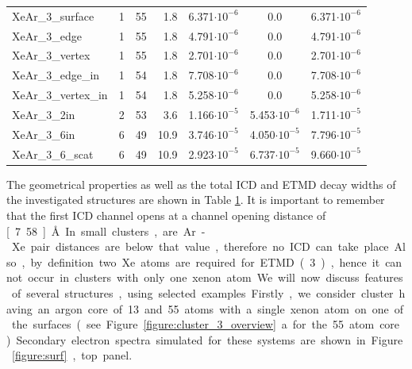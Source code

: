 \begin{table}[h]
\begin{tabular}{lrrrccc}
XeAr\_3\_surface     &      1   &     55   &  1.8  & 6.371$\cdot 10^{-6}$ & 0.0                  & 6.371$\cdot 10^{-6}$ \\
XeAr\_3\_edge        &      1   &     55   &  1.8  & 4.791$\cdot 10^{-6}$ & 0.0                  & 4.791$\cdot 10^{-6}$ \\
XeAr\_3\_vertex      &      1   &     55   &  1.8  & 2.701$\cdot 10^{-6}$ & 0.0                  & 2.701$\cdot 10^{-6}$ \\
XeAr\_3\_edge\_in    &      1   &     54   &  1.8  & 7.708$\cdot 10^{-6}$ & 0.0                  & 7.708$\cdot 10^{-6}$ \\
XeAr\_3\_vertex\_in  &      1   &     54   &  1.8  & 5.258$\cdot 10^{-6}$ & 0.0                  & 5.258$\cdot 10^{-6}$ \\
XeAr\_3\_2in         &      2   &     53   &  3.6  & 1.166$\cdot 10^{-5}$ & 5.453$\cdot 10^{-6}$ & 1.711$\cdot 10^{-5}$ \\
XeAr\_3\_6in         &      6   &     49   & 10.9  & 3.746$\cdot 10^{-5}$ & 4.050$\cdot 10^{-5}$ & 7.796$\cdot 10^{-5}$ \\
XeAr\_3\_6\_scat     &      6   &     49   & 10.9  & 2.923$\cdot 10^{-5}$ & 6.737$\cdot 10^{-5}$ & 9.660$\cdot 10^{-5}$ \\
\bottomrule
\end{tabular}
\label{table:theo_gammas}
\end{table}
%
The geometrical properties as well as the total ICD and ETMD decay widths
of the investigated structures are shown in Table \ref{table:theo_gammas}.
It is important to remember that the first ICD channel opens at a
channel opening distance of \unit[7.58]{\AA}. In small
clusters, are Ar-Xe pair distances are below that value, therefore 
no ICD can take place. Also, by definition two Xe atoms are
required for ETMD(3), hence it cannot occur in clusters with only one xenon atom.
%

We will now discuss features of several structures, using selected examples.

Firstly, we consider cluster having an argon core of 13 and 55 atoms with a single xenon
atom on one of the surfaces (see Figure \ref{figure:cluster_3_overview}a
for the 55 atom core).
Secondary electron spectra simulated for these systems are shown in Figure \ref{figure:surf}, top panel.

